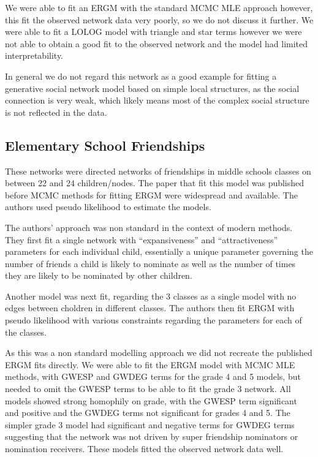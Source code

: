 \documentclass[
]{statsoc}
\begin{document}
We were able to fit an ERGM with the standard MCMC MLE approach however,
this fit the observed network data very poorly, so we do not discuss it
further. We were able to fit a LOLOG model with triangle and star terms
however we were not able to obtain a good fit to the observed network
and the model had limited interpretability.

In general we do not regard this network as a good example for fitting a
generative social network model based on simple local structures, as the
social connection is very weak, which likely means most of the complex
social structure is not reflected in the data.

\subsection{Elementary School Friendships}

These networks were directed networks of friendships in middle schools
classes on between 22 and 24 children/nodes. The paper that fit this
model was published before MCMC methods for fitting ERGM were widespread
and available. The authors used pseudo likelihood to estimate the
models.

The authors' approach was non standard in the context of modern methods.
They first fit a single network with ``expansiveness'' and
``attractiveness'' parameters for each individual child, essentially a
unique parameter governing the number of friends a child is likely to
nominate as well as the number of times they are likely to be nominated
by other children.

Another model was next fit, regarding the 3 classes as a single model
with no edges between choldren in different classes. The authors then
fit ERGM with pseudo likelihood with various constraints regarding the
parameters for each of the classes.

As this was a non standard modelling approach we did not recreate the
published ERGM fits directly. We were able to fit the ERGM model with
MCMC MLE methods, with GWESP and GWDEG terms for the grade 4 and 5
models, but needed to omit the GWESP terms to be able to fit the grade 3
network. All models showed strong homophily on grade, with the GWESP
term significant and positive and the GWDEG terms not significant for
grades 4 and 5. The simpler grade 3 model had significant and negative
terms for GWDEG terms suggesting that the network was not driven by
super friendship nominators or nomination receivers. These models fitted
the observed network data well.
\end{document}
